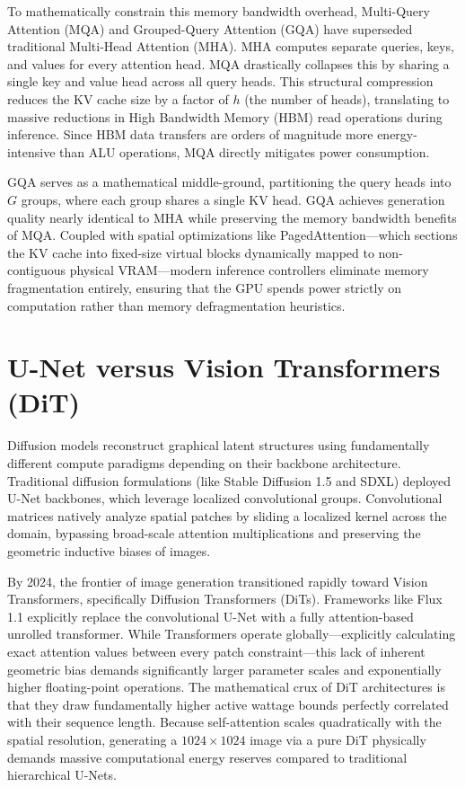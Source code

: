\documentclass[12pt, a4paper]{report}
\begin{document}
To mathematically constrain this memory bandwidth overhead, Multi-Query Attention (MQA) and Grouped-Query Attention (GQA) have superseded traditional Multi-Head Attention (MHA). MHA computes separate queries, keys, and values for every attention head. MQA drastically collapses this by sharing a single key and value head across all query heads. This structural compression reduces the KV cache size by a factor of $h$ (the number of heads), translating to massive reductions in High Bandwidth Memory (HBM) read operations during inference. Since HBM data transfers are orders of magnitude more energy-intensive than ALU operations, MQA directly mitigates power consumption.

GQA serves as a mathematical middle-ground, partitioning the query heads into $G$ groups, where each group shares a single KV head. GQA achieves generation quality nearly identical to MHA while preserving the memory bandwidth benefits of MQA. Coupled with spatial optimizations like PagedAttention—which sections the KV cache into fixed-size virtual blocks dynamically mapped to non-contiguous physical VRAM—modern inference controllers eliminate memory fragmentation entirely, ensuring that the GPU spends power strictly on computation rather than memory defragmentation heuristics.

\section{U-Net versus Vision Transformers (DiT)}
Diffusion models reconstruct graphical latent structures using fundamentally different compute paradigms depending on their backbone architecture. Traditional diffusion formulations (like Stable Diffusion 1.5 and SDXL) deployed U-Net backbones, which leverage localized convolutional groups. Convolutional matrices natively analyze spatial patches by sliding a localized kernel across the domain, bypassing broad-scale attention multiplications and preserving the geometric inductive biases of images.

By 2024, the frontier of image generation transitioned rapidly toward Vision Transformers, specifically Diffusion Transformers (DiTs). Frameworks like Flux 1.1 explicitly replace the convolutional U-Net with a fully attention-based unrolled transformer. While Transformers operate globally—explicitly calculating exact attention values between every patch constraint—this lack of inherent geometric bias demands significantly larger parameter scales and exponentially higher floating-point operations. The mathematical crux of DiT architectures is that they draw fundamentally higher active wattage bounds perfectly correlated with their sequence length. Because self-attention scales quadratically with the spatial resolution, generating a $1024 \times 1024$ image via a pure DiT physically demands massive computational energy reserves compared to traditional hierarchical U-Nets.
\end{document}

